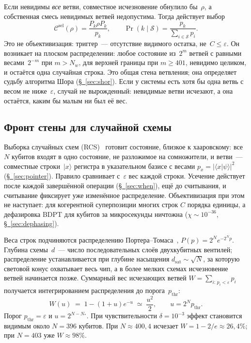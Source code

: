 \documentclass[11pt,a4paper]{article}
\newcommand{\Sinv}{\mathcal{S}}
\begin{document}
Если невидимы \emph{все} ветви, совместное исчезновение обнулило бы~$\rho$, а собственная смесь невидимых ветвей недопустима. Тогда действует выбор
\begin{equation}
\mathcal C^{\mathrm{sel}}(\rho)
=\frac{P_k\rho P_k}{p_k},
\qquad
\Pr(k\mid \Sinv)=\frac{p_k}{\sum_{i\in \Sinv}p_i}.
\end{equation}
Это не объективизация: триггер~--- отсутствие видимого остатка, не~$C\le\varepsilon$. Он возникает на плоском распределении: любое состояние из~$2^m$ ветвей с равными весами~$2^{-m}$ при $m>N_w$, для верхней границы при $m\ge401$, невидимо целиком, и остаётся одна случайная строка. Это общая стена ветвления; она определяет судьбу алгоритма Шора (\hyperref[sec:shor]{\S~\ref*{sec:shor}}). Если у системы есть хотя бы одна ветвь с весом не ниже~$\varepsilon$, случай не вырожденный: невидимые ветви исчезают, а она остаётся, каким бы малым ни был её вес.

\subsection{Фронт стены для случайной схемы}
\label{sec:pruning}

Выборка случайных схем (RCS)~\cite{boixo2018,arute2019} готовит состояние, близкое к хааровскому: все~$N$ кубитов входят в одно состояние, не разложимое на сомножители, и ветви~--- совместные строки~$|x\rangle$ регистра в указательном базисе с весами $p_x=|\langle x|\psi\rangle|^2$ (\hyperref[sec:pointer]{\S~\ref*{sec:pointer}}). Правило сравнивает с~$\varepsilon$ вес каждой строки. Усечение действует после каждой завершённой операции (\hyperref[sec:when]{\S~\ref*{sec:when}}), ещё до считывания, и считывание фиксирует уже изменённое распределение. Объективизация при этом не наступает: для когерентной суперпозиции многих строк $C$ порядка единицы, а дефазировка BDPT для кубитов за микросекунды ничтожна ($\chi\sim10^{-36}$, \hyperref[sec:dephasing]{\S~\ref*{sec:dephasing}}).

Веса строк подчиняются распределению Портера--Томаса~\cite{porter1956,boixo2018}, $P(p)=2^N e^{-2^N p}$. Глубина схемы~$d$~--- число последовательных слоёв двухкубитных вентилей; распределение устанавливается при глубине насыщения $d_{\mathrm{sat}}\sim\sqrt{N}$, за которую световой конус охватывает весь чип, а в более мелких схемах исчезновение ветвей начинается позже. Суммарный вес исчезающих ветвей $W=\sum_{i:\,p_i<\varepsilon}p_i$ получается интегрированием распределения до порога~$p_{\mathrm{thr}}$:
\begin{equation}
W(u)
\;=\;
1-(1+u)e^{-u}
\;\simeq\;
\frac{u^2}{2},
\qquad
u=2^N p_{\mathrm{thr}}.
\end{equation}
Порог $p_{\mathrm{thr}}=\varepsilon$ и $u=2^{N-N_*}$. При чувствительности $\delta=10^{-3}$ эффект становится видимым около $N=396$ кубитов. При $N\approx400{,}4$ исчезает $W=1-2/e\approx26{,}4\%$; при $N=403$ уже $W\approx98\%$.
\end{document}
